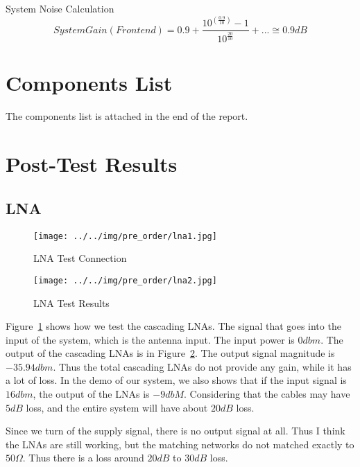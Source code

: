 \documentclass[]{article}
\begin{document}
    System Noise Calculation
    \begin{equation}
        System Gain (Front end) = 0.9 +
        \frac{10^(\frac{0.9}{10})-1}{10^\frac{20}{10}} + ... \cong 0.9dB
    \end{equation}

\section{Components List}
    The components list is attached in the end of the report.

\section{Post-Test Results}
\subsection{LNA}
    \begin{figure}[t!]
        \begin{center}
            \vspace{-0.3in}
            \texttt{[image: ../../img/pre\_order/lna1.jpg]}
            \caption{LNA Test Connection}
            \label{fig:lna1}
        \end{center}
    \end{figure}

    \begin{figure}[b!]
        \begin{center}
            \vspace{-0in}
            \texttt{[image: ../../img/pre\_order/lna2.jpg]}
            \caption{LNA Test Results}
            \label{fig:lna2}
        \end{center}
    \end{figure}

    Figure~\ref{fig:lna1} shows how we test the cascading LNAs. The signal that
    goes into the input of the system, which is the antenna input. The input
    power is $0dbm$. The output of the cascading LNAs is in Figure~\ref{fig:lna2}.
    The output signal magnitude is $-35.94dbm$. Thus the total cascading LNAs
    do not provide any gain, while it has a lot of loss. In the demo of our
    system, we also shows that if the input signal is $16dbm$, the output of
    the LNAs is $-9dbM$. Considering that the cables may have $5dB$ loss,
    and the entire system will have about $20dB$ loss.

    Since we turn of the supply signal, there is no output signal at all. Thus I
    think the LNAs are still working, but the matching networks do not matched
    exactly to $50\Omega$. Thus there is a loss around $20dB$ to $30dB$ loss.
\end{document}
